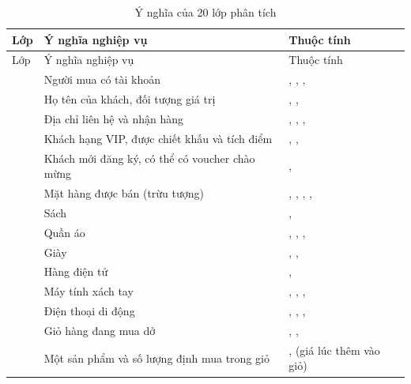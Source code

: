 \documentclass[12pt,a4paper]{article}
\begin{document}
\begin{longtable}{@{}P{2.6cm}P{6.5cm}P{6.8cm}@{}}
\caption{Ý nghĩa của 20 lớp phân tích}\label{tab:classes}\\
\toprule
Lớp & Ý nghĩa nghiệp vụ & Thuộc tính\\
\midrule
\endfirsthead
\toprule
Lớp & Ý nghĩa nghiệp vụ & Thuộc tính\\
\midrule
\endhead
\small{} & \small Người mua có tài khoản & \small{}, , , \\
\small{} & \small Họ tên của khách, đối tượng giá trị & \small{}, , \\
\small{} & \small Địa chỉ liên hệ và nhận hàng & \small{}, , , \\
\small{} & \small Khách hạng VIP, được chiết khấu và tích điểm & \small{}, , \\
\small{} & \small Khách mới đăng ký, có thể có voucher chào mừng & \small{}, \\
\small{} & \small Mặt hàng được bán (trừu tượng) & \small{}, , , , \\
\small{} & \small Sách & \small{}, \\
\small{} & \small Quần áo & \small{}, , , \\
\small{} & \small Giày & \small{}, , \\
\small{} & \small Hàng điện tử & \small{}, \\
\small{} & \small Máy tính xách tay & \small{}, , , \\
\small{} & \small Điện thoại di động & \small{}, , , \\
\small{} & \small Giỏ hàng đang mua dở & \small{}, , \\
\small{} & \small Một sản phẩm và số lượng định mua trong giỏ & \small{},  (giá lúc thêm vào giỏ)\\

\end{longtable}
\end{document}
